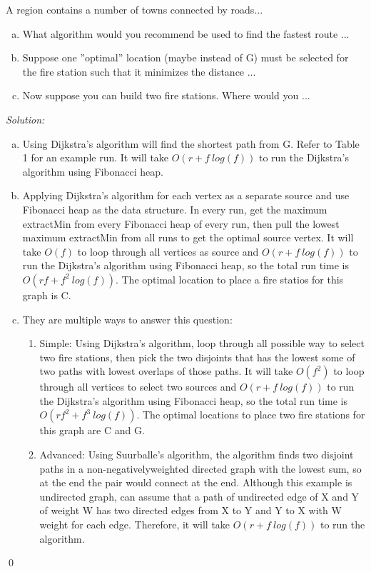 \documentclass[12pt]{article}
\newenvironment{problem}[2][Problem]{\begin{trivlist}
\item[\hskip \labelsep {\bfseries #1}\hskip \labelsep {\bfseries #2.}]}{\end{trivlist}}
\newenvironment{sol}
    {\emph{Solution:}
    }
    {
    \qed
    }
\begin{document}
\begin{problem}{1} A region contains a number of towns connected by roads...
\begin{enumerate}[(a)]
    \item What algorithm would you recommend be used to find the fastest route ...
    \item  Suppose one ”optimal” location (maybe instead of G) must be selected for the fire station such that it minimizes the distance ...
    \item  Now suppose you can build two fire stations.  Where would you ...
\end{enumerate}
\end{problem}
\begin{sol}
\begin{enumerate}[(a)]
    \item Using Dijkstra's algorithm will find the shortest path from G. Refer to Table 1 for an example run. It will take $O(r+f\ log(f))$ to run the Dijkstra's algorithm using Fibonacci heap.

    \item  Applying Dijkstra's algorithm for each vertex as a separate source and use Fibonacci heap as the data structure. In every run, get the maximum extractMin from every Fibonacci heap of every run, then pull the lowest maximum extractMin from all runs to get the optimal source vertex. It will take $O(f)$ to loop through all vertices as source and $O(r+f\ log(f))$ to run the Dijkstra's algorithm using Fibonacci heap, so the total run time is $O(rf+f^2\  log(f))$. The optimal location to place a fire statios for this graph is C.
    \item  They are multiple ways to answer this question:
    \begin{enumerate}
        \item Simple: Using Dijkstra's algorithm, loop through all possible way to select two fire stations, then pick the two disjoints that has the lowest some of two paths with lowest overlaps of those paths. It will take $O(f^2)$ to loop through all vertices to select two sources and $O(r+f\ log(f))$ to run the Dijkstra's algorithm using Fibonacci heap, so the total run time is $O(rf^2+f^3\  log(f))$. The optimal locations to place two fire stations for this graph are C and G.
        \item Advanced: Using Suurballe's algorithm, the algorithm finds two disjoint paths in a non-negativelyweighted directed graph with the lowest sum, so at the end the pair would connect at the end. Although this example is undirected graph, can assume that a path of undirected edge of X and Y of weight W has two directed edges from X to Y and Y to X with W weight for each edge. Therefore, it will take $O(r+f\ log(f))$ to run the algorithm.
    \end{enumerate}
    
\end{enumerate}
\end{sol}
\end{document}
